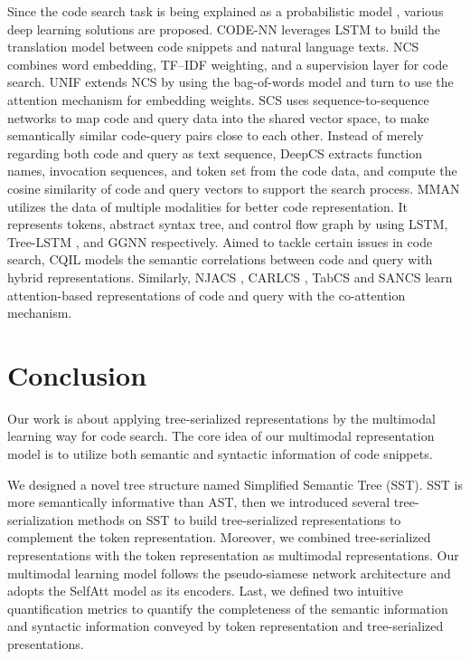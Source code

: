 \documentclass[conference]{IEEEtran}
\begin{document}
Since the code search task is being explained as a probabilistic model \cite{Allamanis2015BimodalMO}, various deep learning solutions are proposed. CODE-NN \cite{Iyer2016SummarizingSC} leverages LSTM to build the translation model between code snippets and natural language texts. NCS \cite{Sachdev2018RetrievalOS} combines word embedding, TF–IDF weighting, and a supervision layer for code search. UNIF \cite{Cambronero2019WhenDL} extends NCS by using the bag-of-words model and turn to use the attention mechanism for embedding weights. SCS \cite{Husain_2018,GitHub_Blog_2018} uses sequence-to-sequence networks to map code and query data into the shared vector space, to make semantically similar code-query pairs close to each other. Instead of merely regarding both code and query as text sequence, DeepCS \cite{Gu2018DeepCS} extracts function names, invocation sequences, and token set from the code data, and compute the cosine similarity of code and query vectors to support the search process. MMAN \cite{Wan2019MultimodalAN} utilizes the data of multiple modalities for better code representation. It represents tokens, abstract syntax tree, and control flow graph by using LSTM, Tree-LSTM \cite{Tai2015ImprovedSR}, and GGNN \cite{Li2016GatedGS} respectively. Aimed to tackle certain issues in code search, CQIL \cite{Li2020LearningCI} models the semantic correlations between code and query with hybrid representations. Similarly, NJACS \cite{Hu2020NeuralJA}, CARLCS \cite{Shuai2020ImprovingCS}, TabCS \cite{Xu2021TwoStageAM} and SANCS \cite{Fang2021SelfAttentionNF} learn attention-based representations of code and query with the co-attention mechanism.
 \section{Conclusion}
\label{sec:conclusion}

Our work is about applying tree-serialized representations by the multimodal learning way for code search. The core idea of our multimodal representation model is to utilize both semantic and syntactic information of code snippets.

We designed a novel tree structure named Simplified Semantic Tree (SST). SST is more semantically informative than AST, then we introduced several tree-serialization methods on SST to build tree-serialized representations to complement the token representation. Moreover, we combined tree-serialized representations with the token representation as multimodal representations. Our multimodal learning model follows the pseudo-siamese network architecture and adopts the SelfAtt model as its encoders. Last, we defined two intuitive quantification metrics to quantify the completeness of the semantic information and syntactic information conveyed by token representation and tree-serialized presentations.
\end{document}

